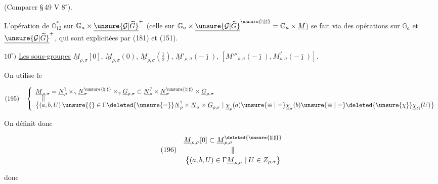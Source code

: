 (Comparer \S\,49 \uline{$\mathrm V$} $8^{\circ}$).

L'opération de $\mathbb O_{12}^{*}$ sur
$\mathbb G_a\times\underline{\unsure{\mathcal G|\widetilde G}}^{+}$
(celle sur $\mathbb G_a\times\underline{\unsure{\mathcal G|\widetilde G}}^{\unsure{\natural|\sharp}}
=\mathbb G_a\times\underline M$) se fait via des opérations sur
$\mathbb G_a$ et $\underline{\unsure{\mathcal G|\widetilde G}}^{+}$, qui sont explicitées
 par (181) et (151).



$10^{\circ})$ \uline{Les sous-groupes}
$\underline M_{\rho,\sigma}[0]$, $\underline M_{\rho,\sigma}(0)$,
$\underline M_{\rho,\sigma}(\frac12)$,
$\underline M'_{\rho,\sigma}(-\bar\jmath)$,
$[M'''_{\rho,\sigma}(-\bar\jmath),M^{?}_{\rho,\sigma}(-\bar\jmath)]$.

On utilise le 

\[
(195)\quad
\left\{\begin{array}{l}
\underline M_{\rho,\sigma}
=\underline N_\rho^{?}\times_\gamma
 \underline N_\sigma^{\unsure{\natural|\sharp}}\times_\gamma
 \underline G_{\rho,\sigma}
\subset\underline N_\rho^{?}\times
 \underline N_\sigma^{\unsure{\natural|\sharp}}\times
 \underline G_{\rho,\sigma}
\\[-2pt]
\quad\Vert
\\[-2pt]
\bigl\{(a,b,U)\,\unsure{\{}\in
 \Gamma\deleted{\unsure{=}}\underline N_\rho^{?}
 \times\underline N_\sigma\times\underline G_{\rho,\sigma}
 \mid\underline\chi_\rho(a)\unsure{\equiv|=}
 \underline\chi_\sigma(b)\unsure{\equiv|=}
 \deleted{\unsure{\chi}}\underline\chi_G(U)\bigr\}
\end{array}\right.
\]

On définit donc

\[
(196)\quad\begin{gathered}
\underline M_{\rho,\sigma}[0]\subset
\underline M_{\rho,\sigma}^{\deleted{\unsure{\natural|\sharp}}}
\\[-2pt]
\Vert
\\[-2pt]
\bigl\{(a,b,U)\in\Gamma\underline M_{\rho,\sigma}
 \mid U\in Z_{\rho,\sigma}\bigr\}
\end{gathered}
\]


donc

